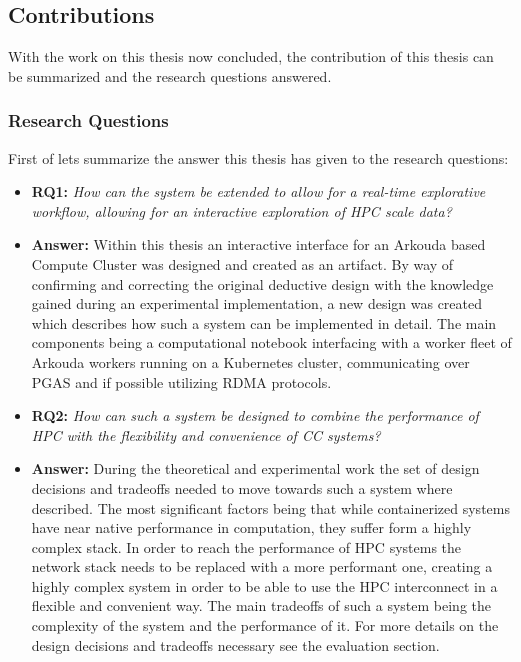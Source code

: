 \pagebreak

\subsection{Contributions}

With the work on this thesis now concluded,
the contribution of this thesis can be summarized and the research questions answered.

\subsubsection{Research Questions}
First of lets summarize the answer this thesis has given to the research questions:

\begin{itemize}
    \item \textbf{RQ1:} \textit{
              How can the system be extended to allow for a real-time explorative workflow, allowing for an interactive exploration of \ac{HPC} scale data?
          }
    \item \textbf{Answer:} Within this thesis an interactive interface for an Arkouda based Compute Cluster was designed and created as an artifact.
          By way of confirming and correcting the original deductive design with the knowledge gained during an experimental implementation,
          a new design was created which describes how such a system can be implemented in detail. The main components being a
          computational notebook interfacing with a worker fleet of Arkouda workers running on a Kubernetes cluster, communicating over
          \ac{PGAS} and if possible utilizing \ac{RDMA} protocols.
    \item \textbf{RQ2:} \textit{
              How can such a system be designed to combine the performance of \ac{HPC} with the flexibility and convenience of \ac{CC} systems?
          }
    \item \textbf{Answer:} During the theoretical and experimental work the set of design decisions and tradeoffs needed to move towards such a
          system where described.
          The most significant factors being that while containerized systems have near native performance in computation, they suffer form
          a highly complex stack. In order to reach the performance of \ac{HPC} systems the network stack needs to be replaced
          with a more performant one, creating a highly complex system in order to be able to use the \ac{HPC} interconnect in a flexible
          and convenient way. The main tradeoffs of such a system being the complexity of the system and the performance of it.
          For more details on the design decisions and tradeoffs necessary see the evaluation section.

\end{itemize}

